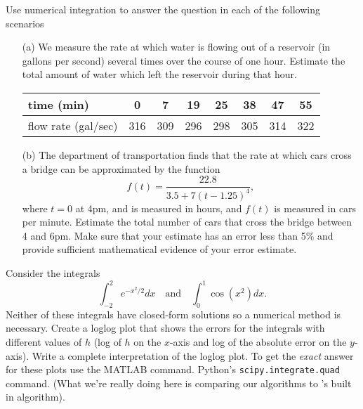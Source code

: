 \begin{problem}
    Use numerical integration to answer the question in each of the following scenarios
    \begin{enumerate}
        \item[(a)] We measure the rate at which water is flowing out of a reservoir (in
            gallons per second) several times over the course of one hour.  Estimate the
            total amount of water which left the reservoir during that hour.
            \begin{center}
                \begin{tabular}{|l||c|c|c|c|c|c|c|}
                    \hline
                    time (min) & 0 & 7 & 19 & 25 & 38 & 47 & 55 \\ \hline
                    flow rate (gal/sec) & 316 & 309 & 296 & 298 & 305 & 314 & 322 \\ \hline
                \end{tabular}
            \end{center}
        \item[(b)] The department of transportation finds that the rate at which cars
            cross a bridge can be approximated by the function
            \[ f(t) = \frac{22.8 }{3.5 + 7(t-1.25)^4} , \]
            where $t=0$ at 4pm, and is measured in hours, and $f(t)$ is measured in cars
            per minute.  Estimate the total number of
            cars that cross the bridge between 4 and 6pm.  Make sure that your estimate has
            an error less than 5\% and provide sufficient mathematical evidence of your
            error estimate.
    \end{enumerate}
\end{problem}


\begin{problem}
    Consider the integrals 
    \[ \int_{-2}^2 e^{-x^2/2} dx \quad \text{and} \quad \int_0^1 \cos(x^2) dx. \]
    Neither of these integrals have closed-form solutions so a numerical method is
    necessary.  Create a loglog plot that shows the errors for the integrals with different values of $h$ (log
    of $h$ on the $x$-axis and log of the absolute error on the $y$-axis).
    Write a complete interpretation of the loglog plot.  
    To get the {\it exact} answer for these plots use the 
    \ifnum{} MATLAB  command.
    \else
    Python's \texttt{scipy.integrate.quad} command.
    \fi
    (What we're really doing here is comparing our algorithms to \ProgLang's built in algorithm).
\end{problem}


